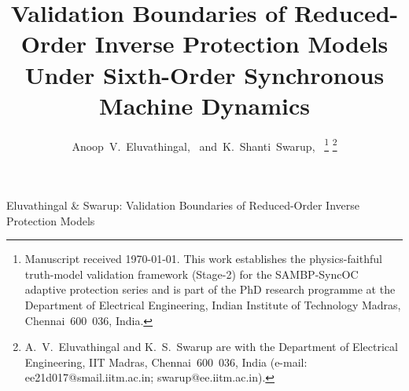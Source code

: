 \documentclass[journal,twoside,letterpaper]{IEEEtran}
\begin{document}
\title{Validation Boundaries of Reduced-Order Inverse Protection
       Models Under Sixth-Order Synchronous Machine Dynamics}

\author{Anoop~V.~Eluvathingal,~
        and~K.~Shanti~Swarup,~%
\thanks{Manuscript received \today.
        This work establishes the physics-faithful truth-model
        validation framework (Stage-2) for the SAMBP-SyncOC adaptive
        protection series and is part of the PhD research programme at
        the Department of Electrical Engineering, Indian Institute of
        Technology Madras, Chennai~600~036, India.}%
\thanks{A.~V.~Eluvathingal and K.~S.~Swarup are with the Department of
        Electrical Engineering, IIT Madras, Chennai~600~036, India
        (e-mail: ee21d017@smail.iitm.ac.in; swarup@ee.iitm.ac.in).}}

%
{Eluvathingal \& Swarup: Validation Boundaries of Reduced-Order Inverse
Protection Models}

\maketitle
\end{document}
